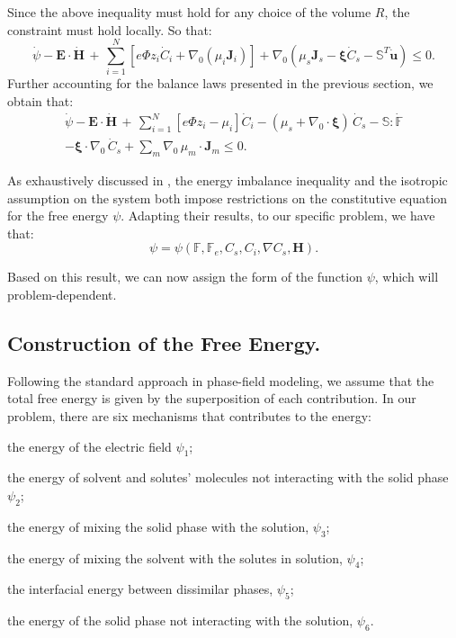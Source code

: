 \documentclass[runningheads]{llncs}
\newcommand{\indentitem}{\setlength\itemindent{20pt}}
\newcommand{\F}{\ensuremath{\mathbb{F}}}
\begin{document}
Since the above inequality must hold for any choice of the volume $R$, the constraint must hold locally. So that:
\begin{equation}
\dot{\psi} - \mathbf{E}\cdot \dot{\mathbf{H}} \, + \, \sum\limits_{i=1}^{N} \left[e \Phi  z_i \dot{C}_i+ \nabla_0 \left(\mu_i \mathbf{J}_i \right)\right] + \nabla_0 (\mu_s \mathbf{J}_s- \boldsymbol{\xi}\dot{C}_s -\mathbb{S}^T\mathbf{\dot{u}}) \leq 0. 
\end{equation}
Further accounting for the balance laws presented in the previous section, we obtain that:
\begin{equation}
\begin{aligned}
\dot{\psi} - \mathbf{E}\cdot \dot{\mathbf{H}} \, + \, \sum\limits_{i=1}^{N} \left[e \Phi  z_i - \mu_i\right] \dot{C}_i - (\mu_s + \nabla_0 \cdot \boldsymbol{\xi})\,\dot{C}_s -\mathbb{S}:\dot{\F}\\
-\boldsymbol{\xi} \cdot \nabla_0 \, \dot{C}_s + \sum\limits_{m} \nabla_0 \, \mu_m \cdot \mathbf{J}_m \leq 0.
\end{aligned} 
\end{equation}

As exhaustively discussed in \cite{GURTIN,Plasto}, the energy imbalance inequality and the isotropic assumption on the system both impose restrictions on the constitutive equation for the free energy $\psi$. Adapting their results, to our specific problem, we have that:
\begin{equation}
\psi = \psi (\F,\F_e, C_s, C_i, \nabla C_s,\mathbf{H}).
\end{equation}

Based on this result, we can now assign the form of the function $\psi$, which will problem-dependent.
\subsection{Construction of the Free Energy.}
Following the standard approach in phase-field modeling, we assume that the total free energy is given by the superposition of each contribution. In our problem, there are six mechanisms that contributes to the energy: 

\begin{enumerate}
	{\indentitem\item[\textbullet] the energy of the electric field $\psi_1$;}
	{\indentitem \item[\textbullet] the energy of solvent and solutes' molecules not interacting with the solid phase $\psi_2$;}
	{\indentitem\item[\textbullet] the energy of mixing the solid phase with the solution, $\psi_3$;}
	{\indentitem\item[\textbullet] the energy of mixing the solvent with the solutes in solution, $\psi_4$;}
	{\indentitem\item[\textbullet] the interfacial energy between dissimilar phases, $\psi_5$;}
	{\indentitem\item[\textbullet] the energy of the solid phase not interacting with the solution, $\psi_6$.}
\end{enumerate}
\end{document}
